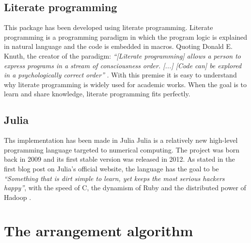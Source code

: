 \section{Literate programming}
This package has been developed using literate programming.
Literate programming is a programming paradigm in which the program
logic is explained in natural language and the code is embedded in macros.
Quoting Donald E. Knuth, the creator of the paradigm: 
\textit{``[Literate programming] allows a person to express programs in a stream of
consciousness order. [...] [Code can] be explored
in a psychologically correct order''} \cite{knuth}. 
With this premise it is easy to understand why literate programming 
is widely used for academic works.
When the goal is to learn and share knowledge, literate programming fits perfectly.


\section{Julia}

Ths implementation has been made in Julia
Julia is a relatively new high-level programming language targeted 
to numerical computing. The project was born back in 2009 and its first
stable version was released in 2012. As stated in the first blog post
on Julia's official website, the language has the goal
to be \textit{``Something that is dirt simple to learn, 
yet keeps the most serious hackers happy''}, with the speed of C, 
the dynamism of Ruby and the distributed power of Hadoop
\cite{julia}.


\chapter{The arrangement algorithm}
\label{ch:arrangement_algorithm}

